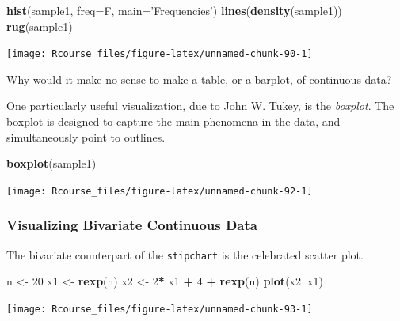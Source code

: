 \documentclass[]{book}
\newenvironment{Shaded}{\begin{snugshade}}{\end{snugshade}}
\newcommand{\KeywordTok}[1]{\textcolor[rgb]{0.13,0.29,0.53}{\textbf{#1}}}
\newcommand{\DataTypeTok}[1]{\textcolor[rgb]{0.13,0.29,0.53}{#1}}
\newcommand{\DecValTok}[1]{\textcolor[rgb]{0.00,0.00,0.81}{#1}}
\newcommand{\StringTok}[1]{\textcolor[rgb]{0.31,0.60,0.02}{#1}}
\newcommand{\OperatorTok}[1]{\textcolor[rgb]{0.81,0.36,0.00}{\textbf{#1}}}
\newcommand{\NormalTok}[1]{#1}
\theoremstyle{definition}
\theoremstyle{definition}
\theoremstyle{definition}
\theoremstyle{remark}
\let\BeginKnitrBlock\begin \let\EndKnitrBlock\end
\begin{document}
\begin{Shaded}
\begin{Highlighting}[]
\KeywordTok{hist}\NormalTok{(sample1, }\DataTypeTok{freq=}\NormalTok{F, }\DataTypeTok{main=}\StringTok{'Frequencies'}\NormalTok{)   }
\KeywordTok{lines}\NormalTok{(}\KeywordTok{density}\NormalTok{(sample1))                     }
\KeywordTok{rug}\NormalTok{(sample1)}
\end{Highlighting}
\end{Shaded}

\texttt{[image: Rcourse\_files/figure-latex/unnamed-chunk-90-1]}

\BeginKnitrBlock{remark}
{}Why would it make no sense to make a table,
or a barplot, of continuous data?
\EndKnitrBlock{remark}

One particularly useful visualization, due to John W. Tukey, is the
\emph{boxplot}. The boxplot is designed to capture the main phenomena in
the data, and simultaneously point to outlines.

\begin{Shaded}
\begin{Highlighting}[]
\KeywordTok{boxplot}\NormalTok{(sample1)    }
\end{Highlighting}
\end{Shaded}

\texttt{[image: Rcourse\_files/figure-latex/unnamed-chunk-92-1]}

\subsubsection{Visualizing Bivariate Continuous
Data}\label{visualizing-bivariate-continuous-data}

The bivariate counterpart of the \texttt{stipchart} is the celebrated
scatter plot.

\begin{Shaded}
\begin{Highlighting}[]
\NormalTok{n <-}\StringTok{ }\DecValTok{20}
\NormalTok{x1 <-}\StringTok{ }\KeywordTok{rexp}\NormalTok{(n)}
\NormalTok{x2 <-}\StringTok{ }\DecValTok{2}\OperatorTok{*}\StringTok{ }\NormalTok{x1 }\OperatorTok{+}\StringTok{ }\DecValTok{4} \OperatorTok{+}\StringTok{ }\KeywordTok{rexp}\NormalTok{(n)}
\KeywordTok{plot}\NormalTok{(x2}\OperatorTok{~}\NormalTok{x1)}
\end{Highlighting}
\end{Shaded}

\texttt{[image: Rcourse\_files/figure-latex/unnamed-chunk-93-1]}
\end{document}
